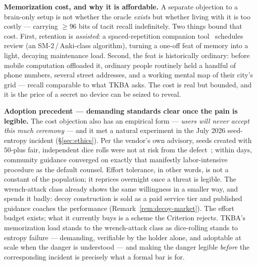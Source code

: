 \textbf{Memorization cost, and why it is affordable.} A separate objection to a
brain-only setup is not whether the oracle \emph{exists} but whether living with it
is too costly --- carrying $\ge 96$ bits of tacit recall indefinitely. Two things
bound that cost. First, retention is \emph{assisted}: a spaced-repetition
companion tool~\cite{gw-cpnf} schedules review (an
SM-2\,/\,Anki-class algorithm), turning a one-off feat of memory into a light,
decaying maintenance load. Second, the feat is historically ordinary: before mobile
computation offloaded it, ordinary people routinely held a handful of phone numbers,
several street addresses, and a working mental map of their city's grid --- recall
comparable to what TKBA asks. The cost is real but bounded, and it is the price of a
secret no device can be seized to reveal.

\textbf{Adoption precedent --- demanding standards clear once the pain is
legible.} The cost objection also has an empirical form --- \emph{users will
never accept this much ceremony} --- and it met a natural experiment in the
July 2026 seed-entropy incident (\S\ref{sec:ethics}). Per the vendor's own
advisory, seeds created with $50$-plus fair, independent dice rolls were not
at risk from the defect~\cite{coinkite-entropy};
within days, community guidance converged on exactly that manifestly
labor-intensive procedure as the default counsel. Effort tolerance, in other
words, is not a constant of the population; it reprices overnight once a
threat is legible. The wrench-attack class already shows the same willingness in
a smaller way, and spends it badly: decoy construction is sold as a paid service
tier and published guidance coaches the performance
(Remark~\ref{rem:decoy-market}). The effort budget exists; what it currently buys
is a scheme the Criterion rejects. TKBA's memorization load stands to the wrench-attack class
as dice-rolling stands to entropy failure --- demanding, verifiable by the
holder alone, and adoptable at scale when the danger is understood --- and
making the danger legible \emph{before} the corresponding incident is
precisely what a formal bar is for.

